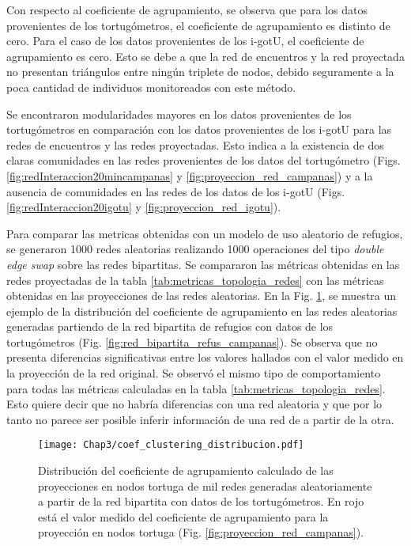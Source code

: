 Con respecto al coeficiente de agrupamiento, se observa que para los datos provenientes de los tortugómetros, el coeficiente de agrupamiento es distinto de cero. Para el caso de los datos provenientes de los i-gotU, el coeficiente de agrupamiento es cero. Esto se debe a que la red de encuentros y la red proyectada no presentan triángulos entre ningún triplete de nodos, debido seguramente a la poca cantidad de individuos monitoreados con este método. 

Se encontraron modularidades mayores en los datos provenientes de los tortugómetros en comparación con los datos provenientes de los i-gotU para las redes de encuentros y las redes proyectadas. Esto indica a la existencia de dos claras comunidades en las redes provenientes de los datos del tortugómetro (Figs. \ref{fig:redInteraccion20mincampanas} y \ref{fig:proyeccion_red_campanas}) y a la ausencia de comunidades en las redes de los datos de los i-gotU (Figs. \ref{fig:redInteraccion20igotu} y \ref{fig:proyeccion_red_igotu}).
 
Para comparar las metricas obtenidas con un modelo de uso aleatorio de refugios, se generaron 1000 redes aleatorias  realizando 1000 operaciones del tipo \textit{double edge swap} sobre las redes bipartitas. Se compararon las métricas obtenidas en las redes proyectadas de la tabla \ref{tab:metricas_topologia_redes} con las métricas obtenidas en las proyecciones de las redes aleatorias. En la Fig. \ref{fig:distribucion_coef_agrupa}, se muestra un ejemplo de la distribución del coeficiente de agrupamiento en las redes aleatorias generadas partiendo de la red bipartita de refugios con datos de los tortugómetros (Fig. \ref{fig:red_bipartita_refus_campanas}). Se observa que no presenta diferencias significativas entre los valores hallados con el valor medido en la proyección de la red original. Se observó el mismo tipo de comportamiento para todas las métricas calculadas en la tabla \ref{tab:metricas_topologia_redes}. Esto quiere decir que no habría diferencias con una red aleatoria y que por lo tanto no parece ser posible inferir información de una red de a partir de la otra.
\begin{figure}[ht]
    \begin{center}
        \texttt{[image: Chap3/coef\_clustering\_distribucion.pdf]}
        \caption[Distribución del coeficiente de agrupamiento en proyecciones de redes aleatorias.]{Distribución del coeficiente de agrupamiento calculado de las proyecciones en nodos tortuga de mil redes generadas aleatoriamente a partir de la red bipartita con datos de los tortugómetros. En rojo está el valor medido del coeficiente de agrupamiento para la proyección en nodos tortuga (Fig. \ref{fig:proyeccion_red_campanas}).}
        \label{fig:distribucion_coef_agrupa}
       
        \end{center}
\end{figure}
 
